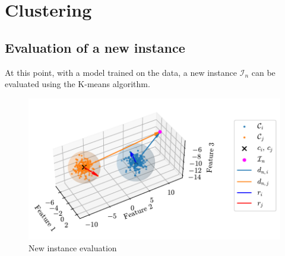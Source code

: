 \chapter{Clustering}

\section{Evaluation of a new instance}

At this point, with a model trained on the data, a new instance $\mathcal{I}_n$ can be evaluated using the K-means algorithm.

\begin{figure}[htbp]
  \centering
  \includegraphics[width=\textwidth]{images/Spheres_2.pdf}
\caption{New instance evaluation}
\label{fig:clust_spheres}
\end{figure}